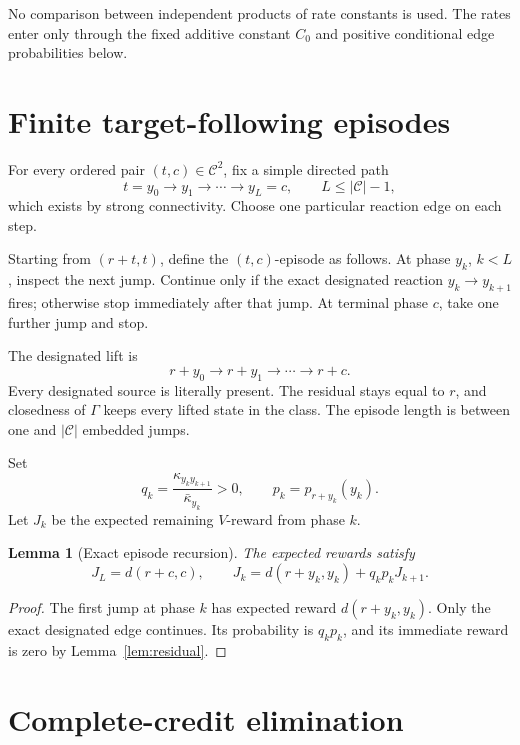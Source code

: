 \documentclass[11pt]{article}
\newtheorem{lemma}[theorem]{Lemma}
\theoremstyle{definition}
\newcommand{\Ccal}{\mathcal C}
\newcommand{\Gamm}{\Gamma}
\begin{document}
No comparison between independent products of rate constants is used.  The
rates enter only through the fixed additive constant \(C_0\) and positive
conditional edge probabilities below.

\section{Finite target-following episodes}

For every ordered pair \((t,c)\in\Ccal^2\), fix a simple directed path
\begin{equation}\label{eq:path}
  t=y_0\longrightarrow y_1\longrightarrow\cdots
   \longrightarrow y_L=c,
  \qquad L\leq |\Ccal|-1,
\end{equation}
which exists by strong connectivity.  Choose one particular reaction edge on
each step.

Starting from \((r+t,t)\), define the \((t,c)\)-episode as follows.  At phase
\(y_k\), \(k<L\), inspect the next jump.  Continue only if the exact
designated reaction \(y_k\to y_{k+1}\) fires; otherwise stop immediately
after that jump.  At terminal phase \(c\), take one further jump and stop.

The designated lift is
\[
  r+y_0\longrightarrow r+y_1\longrightarrow\cdots
  \longrightarrow r+c.
\]
Every designated source is literally present.  The residual stays equal to
\(r\), and closedness of \(\Gamm\) keeps every lifted state in the class.
The episode length is between one and \(|\Ccal|\) embedded jumps.

Set
\[
  q_k=\frac{\kappa_{y_k y_{k+1}}}{\bar\kappa_{y_k}}>0,
  \qquad
  p_k=p_{r+y_k}(y_k).
\]
Let \(J_k\) be the expected remaining \(V\)-reward from phase \(k\).

\begin{lemma}[Exact episode recursion]\label{lem:recursion}
The expected rewards satisfy
\begin{equation}\label{eq:recursion}
  J_L=d(r+c,c),
  \qquad
  J_k=d(r+y_k,y_k)+q_kp_kJ_{k+1}.
\end{equation}
\end{lemma}

\begin{proof}
The first jump at phase \(k\) has expected reward \(d(r+y_k,y_k)\).  Only the
exact designated edge continues.  Its probability is \(q_kp_k\), and its
immediate reward is zero by Lemma~\ref{lem:residual}.
\end{proof}

\section{Complete-credit elimination}
\end{document}
